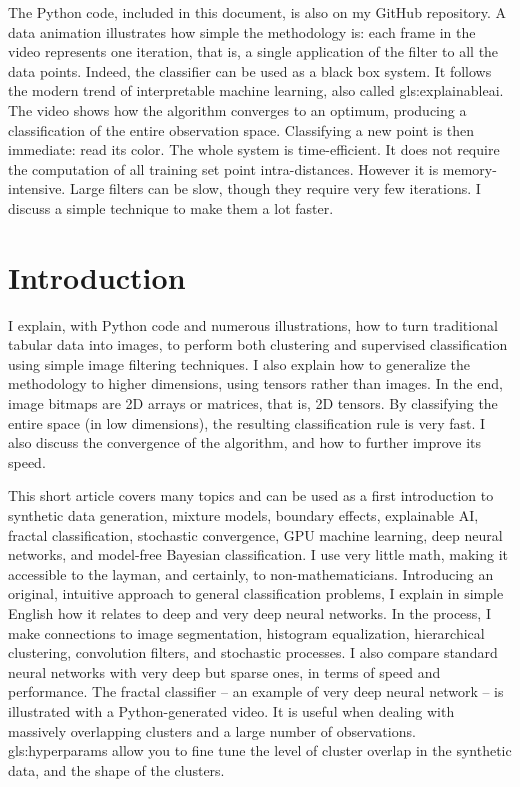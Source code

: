 \documentclass[oneside,10pt]{book}
\begin{document}
The Python code, included in this document, is also on my GitHub repository.
A data animation illustrates how simple the methodology is: each frame in the video represents one iteration, that is, a single application of the filter to all the data points. Indeed, the classifier can be used as a black box system. It follows the modern trend of interpretable machine learning, also called \gls{gls:explainableai}. The video shows how the algorithm converges to an optimum, producing a classification of the entire observation space. Classifying a new point is then immediate: read its color. The whole system is time-efficient. It does not require the computation of all training set point intra-distances. However it is memory-intensive. Large filters can be slow, though they require very few iterations. I discuss a simple technique to make them a lot faster.


\hypersetup{linkcolor=red}


\section{Introduction}\label{vizintro}

I explain, with Python code and numerous illustrations, how to turn traditional tabular data into images, to perform both clustering and supervised classification using simple image filtering techniques. I also explain how to generalize
the methodology to higher dimensions, using tensors rather than images. In the end, image bitmaps are 2D arrays or matrices, that is, 2D tensors.
By classifying the entire space (in low dimensions), the resulting classification rule is very fast. I also discuss the convergence of the algorithm, and how to further improve its speed.

This short article covers many topics and can be used as a first introduction to synthetic data generation, mixture models, boundary effects, explainable AI, fractal classification, stochastic convergence, GPU machine learning, deep neural networks, and model-free Bayesian classification. I use very little math, making it
accessible to the layman, and certainly, to non-mathematicians.  Introducing an original, intuitive approach to general classification problems, I explain in simple English how it
relates to deep and very deep neural networks. In the process, I make connections to image segmentation, histogram equalization, hierarchical clustering,
convolution filters, and stochastic processes. I also compare standard neural networks with very deep but sparse ones, in terms of speed and performance.
The fractal classifier -- an example of very deep neural network -- is illustrated with a Python-generated video. It is useful when dealing with massively overlapping clusters and a large number
of observations. \Glspl{gls:hyperparam} allow you to fine tune the level of cluster overlap in the synthetic data, and the shape of the clusters.
\end{document}
